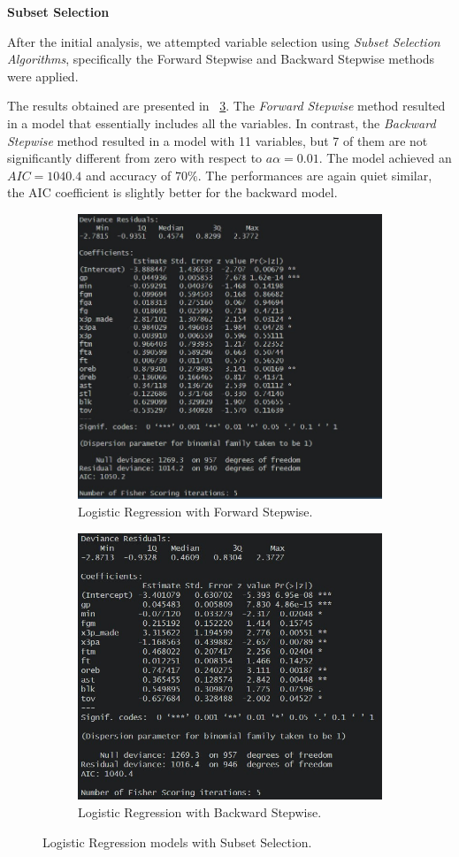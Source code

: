 \vspace{0.2cm}
\textbf{Subset Selection}

After the initial analysis, we attempted variable selection using \textit{Subset Selection Algorithms}, specifically the Forward Stepwise and Backward Stepwise methods were applied. 

The results obtained are presented in \Fig~\ref{fig:LRSSSum}. The \textit{Forward Stepwise} method resulted in a model that essentially includes all the variables. In contrast, the \textit{Backward Stepwise} method resulted in a model with 11 variables, but 7 of them are not significantly different from zero with respect to $a\alpha = 0.01$. The model achieved an $AIC = 1040.4$ and accuracy of $70\%$. The performances are again quiet similar, the AIC coefficient is slightly better for the backward model.

\begin{figure}[h]
	\begin{subfigure}{.6\textwidth}
		\centering
		\includegraphics[width=0.7\linewidth]{ImageFiles/Classification/LogReg/lr_fss_summary}
		\caption{Logistic Regression with Forward Stepwise.}
		\label{fig:LRFSSSum}
	\end{subfigure}
	\begin{subfigure}{.6\textwidth}
		\centering
		\includegraphics[width=0.7\linewidth]{ImageFiles/Classification/LogReg/lr_bss_summary}
		\caption{Logistic Regression with Backward Stepwise.}
		\label{fig:LRBSSSum}
	\end{subfigure}
	\caption{Logistic Regression models with Subset Selection.}
	\label{fig:LRSSSum}
\end{figure}

